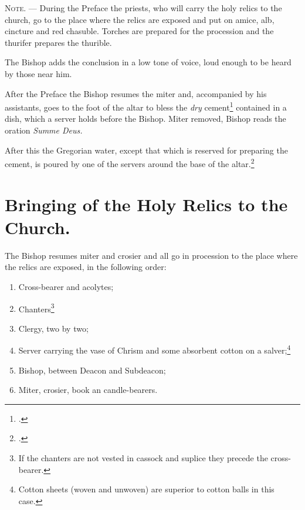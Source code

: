 \documentclass[letterpaper]{report}
\begin{document}
{    \textsc{Note. ---} During the Preface the priests, who will carry the holy
    relics to the church, go to the place where the relics are exposed and put on
    amice, alb, cincture and red chasuble. Torches are prepared for the procession
    and the thurifer prepares the thurible.

    The Bishop adds the conclusion in a low tone of voice, loud enough to be
    heard by those near him.

    \rubric After the Preface the Bishop resumes the miter and, accompanied by
    his assistants, goes to the foot of the altar to bless the \textit{dry}
    cement\footcite[The Pontifical prescribes that he should first mix the
    cement with the water which he previously blessed and then bless the
    mixture. This is not feasible and consequently it is better to keep
    sufficient amount of water in a separate vessel to be poured over the dry
    cement shortly before it is to be used for closing the
    sepulcher.][footnote, p. 77.]{consecranda} contained in a dish, which a
    server holds before the Bishop. Miter removed, Bishop reads the oration
    \textit{Summe Deus.}

    \rubric After this the Gregorian water, except that which is reserved for
    preparing the cement, is poured by one of the servers around the base of
    the altar.\footcite[If much water remains only a small quantity of it is
    poured around the base of the altar, and what is left is afterwards poured
    into the \textit{secrarium.}][footnote 1, p. 78.]{consecranda}

    \section{Bringing of the Holy Relics to the Church.}

    \rubric The Bishop resumes miter and crosier and all go in procession to
    the place where the relics are exposed, in the following order:

    \begin{enumerate}
        \item Cross-bearer and acolytes;
        \item Chanters\footnote{If the chanters are not vested in cassock and
            suplice they precede the cross-bearer.}
        \item Clergy, two by two;
        \item Server carrying the vase of Chrism and some absorbent cotton on a
            salver;\footnote{Cotton sheets (woven and unwoven) are superior to
            cotton balls in this case.}
        \item Bishop, between Deacon and Subdeacon;
        \item Miter, crosier, book an candle-bearers.
    \end{enumerate}

}
\end{document}
